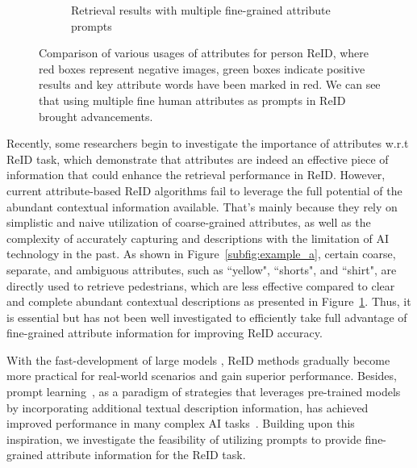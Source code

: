 \documentclass[letterpaper]{article} %
\begin{document}
\begin{figure}[t!]
\begin{subfigure}[t]{1\columnwidth}
        \caption{Retrieval results with multiple fine-grained attribute prompts}
    \label{subfig:example_c}
  \end{subfigure}
   \caption{Comparison of various usages of attributes for person ReID, where red boxes represent negative images, green boxes indicate positive results and key attribute words have been marked in red. We can see that using multiple fine human attributes as prompts in ReID brought advancements.}
	\label{fig:example}
\end{figure}

Recently, some researchers \cite{jia2021spatial,niu2022cross,specker2023upar, zheng2022progressive} begin to investigate the importance of attributes w.r.t ReID task, which demonstrate that attributes are indeed an effective piece of information that could enhance the retrieval performance in ReID.
However, current attribute-based ReID algorithms fail to leverage the full potential of the abundant contextual information available. That's mainly because they rely on simplistic and naive utilization of coarse-grained attributes, as well as the complexity of accurately capturing and descriptions with the limitation of AI technology in the past. As shown in Figure~\ref{subfig:example_a}, certain coarse, separate, and ambiguous attributes, such as ``yellow", ``shorts", and ``shirt", are directly used to retrieve pedestrians, which are less effective compared to clear and complete abundant contextual descriptions as presented in Figure~\ref{subfig:example_c}. Thus, it is essential but has not been well investigated to efficiently take full advantage of fine-grained attribute information for improving ReID accuracy.

With the fast-development of large models \cite{fu2022large,jin2022meta,li2023blip2}, ReID methods gradually become more practical for real-world scenarios and gain superior performance. Besides, prompt learning~\cite{wu2022fast,zhou2022learning}, as a paradigm of strategies that leverages pre-trained models by incorporating additional textual description information, has achieved improved performance in many complex AI tasks~\cite{zeng2022point,luddecke2022image,liu2022dpt}. Building upon this inspiration, we investigate the feasibility of utilizing prompts to provide fine-grained attribute information for the ReID task.
\end{document}
